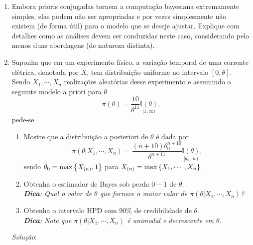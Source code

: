 \documentclass[11pt,a4]{article}\usepackage[]{graphicx}\usepackage[]{xcolor}
\begin{document}
\begin{enumerate}
\item Embora prioris conjugadas tornem a computação bayesiana
  extremamente simples, elas podem não ser apropriadas e por vezes
  simplesmente não existem (de forma útil) para o modelo que se deseje
  ajustar. Explique com detalhes como as análises devem ser conduzidas
  neste caso, considerando pelo menos duas abordagens (de natureza
  distinta).


\item Suponha que em um experimento físico, a variação temporal de uma
  corrente elétrica, denotada por $X$, tem distribuição uniforme no
  intervalo $[0,\theta]$. Sendo $X_1,\cdots,X_n$ realizações aleatórias
  desse experimento e assumindo o seguinte modelo a priori para $\theta$
\[
\pi(\theta) = \frac{10}{\theta^{11}}\underset{{[1,\infty)}}{ \mathbb{I}(\theta)},
\]
pede-se
\begin{enumerate}
	\item[a)] Mostre que a distribuição a posteriori de $\theta$ é dada por
\[
\pi(\theta|X_1,\cdots,X_n) = \frac{(n + 10 )\theta_0^{n + 10 }}{\theta^{n+11}}\underset{{[\theta_0,\infty)}}{ \mathbb{I}(\theta)},
\]
sendo $\theta_0 = {\rm max}\left\{X_{(n)},1\right\} $ para $X_{(n)} = {\rm max}\left\{X_1,\cdots,X_n\right\}$.
	\item[b)] Obtenha o estimador de Bayes sob perda $0-1$ de $\theta$.\\
	{\it {\bf Dica}: Qual o valor de $\theta$ que fornece o maior valor de $\pi(\theta|X_1,\cdots,X_n)$?}

	\item[c)] Obtenha o intervalo HPD com $90\%$ de credibilidade de $\theta$.\\
	{\it {\bf Dica}: Note que $\pi(\theta|X_1,\cdots,X_n)$ é unimodal e decrescente em $\theta$.}
\end{enumerate}


\begin{solucao}

 {\it Solução}:


\end{solucao}
\end{enumerate}
\end{document}
